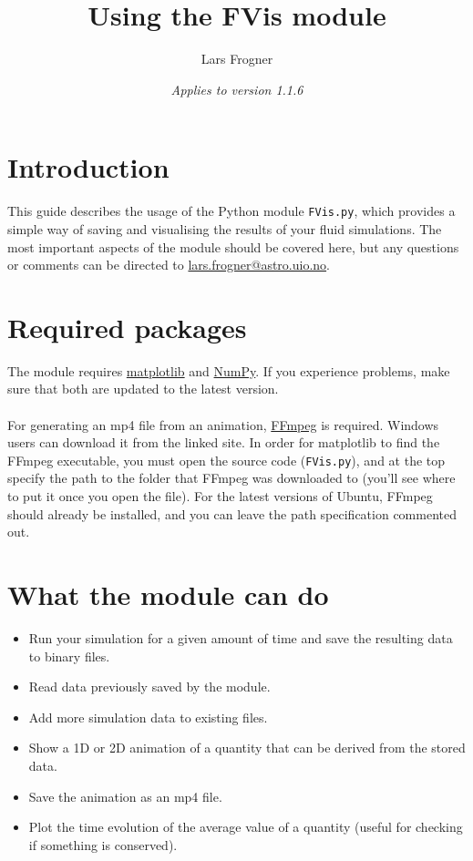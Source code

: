 \documentclass{article}
\newcommand{\ttt}[1]{\texttt{#1}}
\begin{document}
\title{\bfseries Using the FVis module}
\author{Lars Frogner}
\date{\textit{Applies to version 1.1.6}}

\maketitle
\tableofcontents
\newpage
{}

\section{Introduction}
\label{sec:intr}
This guide describes the usage of the Python module \ttt{FVis.py}, which provides a simple way of saving and visualising the results of your fluid simulations. The most important aspects of the module should be covered here, but any questions or comments can be directed to \href{mailto:lars.frogner@astro.uio.no}{lars.frogner@astro.uio.no}.

\section{Required packages}
\label{sec:pack}
The module requires \href{http://matplotlib.org/}{matplotlib} and \href{http://www.numpy.org/}{NumPy}. If you experience problems, make sure that both are updated to the latest version.\\\\
For generating an mp4 file from an animation, \href{https://ffmpeg.org/}{FFmpeg} is required. Windows users can download it from the linked site. In order for matplotlib to find the FFmpeg executable, you must open the source code (\ttt{FVis.py}), and at the top specify the path to the folder that FFmpeg was downloaded to (you'll see where to put it once you open the file). For the latest versions of Ubuntu, FFmpeg should already be installed, and you can leave the path specification commented out.

\section{What the module can do}
\label{sec:cando}
\begin{itemize}
	\item Run your simulation for a given amount of time and save the resulting data to binary files.
	\item Read data previously saved by the module.
	\item Add more simulation data to existing files.
	\item Show a 1D or 2D animation of a quantity that can be derived from the stored data.
	\item Save the animation as an mp4 file.
	\item Plot the time evolution of the average value of a quantity (useful for checking if something is conserved).
\end{itemize}
\end{document}
